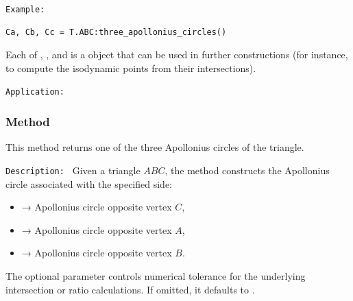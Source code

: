\medskip
\texttt{Example: }
\begin{verbatim}
Ca, Cb, Cc = T.ABC:three_apollonius_circles()
\end{verbatim}

Each of , , and  is a  object that can be
used in further constructions (for instance, to compute the isodynamic points
from their intersections).

\medskip
\texttt{Application: }

\begin{tkzexample}[vbox]
\begin{center}
\end{center}
\end{tkzexample}

\subsubsection{Method }
\label{ssub:apollonius_circle}

This method returns one of the three Apollonius circles of the triangle.

\medskip

\texttt{Description: }
Given a triangle $ABC$, the method  constructs the
Apollonius circle associated with the specified side:
\begin{itemize}
  \item {} → Apollonius circle opposite vertex $C$,
  \item {} → Apollonius circle opposite vertex $A$,
  \item {} → Apollonius circle opposite vertex $B$.
\end{itemize}

The optional parameter  controls numerical tolerance for the
underlying intersection or ratio calculations.
If omitted, it defaults to .

